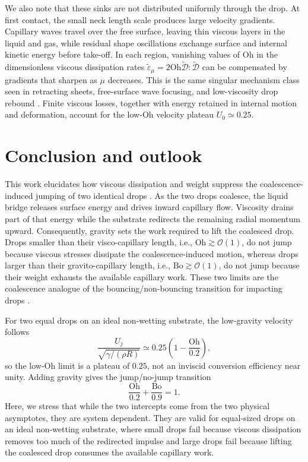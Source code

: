 \documentclass[
reprint,
amsmath,amssymb,
superscriptaddress,
onecolumn,
aps,
prfluids,
longbibliography,
floatfix
]{revtex4-2}
\newcommand{\Oh}{\mathrm{Oh}}
\newcommand{\Bo}{\mathrm{Bo}}
\begin{document}
We also note that these sinks are not distributed uniformly through the drop. At first contact, the small neck length scale produces large velocity gradients. Capillary waves travel over the free surface, leaving thin viscous layers in the liquid and gas, while residual shape oscillations exchange surface and internal kinetic energy before take-off. In each region, vanishing values of $\Oh$ in the dimensionless viscous dissipation rates $\tilde{\varepsilon}_\mu = 2\Oh\bm{\tilde{\mathcal{D}}}:\bm{\tilde{\mathcal{D}}}$ can be compensated by gradients that sharpen as $\mu$ decreases. This is the same singular mechanism class seen in retracting sheets, free-surface wave focusing, and low-viscosity drop rebound \cite{sanjay2022taylor,kayal2025focusing,sanjay2025unifying}. Finite viscous losses, together with energy retained in internal motion and deformation, account for the low-$\Oh$ velocity plateau $U_0\simeq0.25$.

\section{Conclusion and outlook}\label{sec:discussion}

This work elucidates how viscous dissipation and weight suppress the coalescence-induced jumping of two identical drops \cite{boreyko2009self}. As the two drops coalesce, the liquid bridge releases surface energy and drives inward capillary flow. Viscosity drains part of that energy while the substrate redirects the remaining radial momentum upward. Consequently, gravity sets the work required to lift the coalesced drop.
Drops smaller than their visco-capillary length, i.e., $\Oh \gtrsim \mathcal{O}(1)$, do not jump because viscous stresses dissipate the coalescence-induced motion, whereas drops larger than their gravito-capillary length, i.e., $\Bo \gtrsim \mathcal{O}(1)$, do not jump because their weight exhausts the available capillary work.
These two limits are the coalescence analogue of the bouncing/non-bouncing transition for impacting drops \cite{sanjay2023bouncing}.

For two equal drops on an ideal non-wetting substrate, the low-gravity velocity follows
\begin{equation}
    \frac{U_j}{\sqrt{\gamma/(\rho R)}}\simeq0.25\left(1-\frac{\Oh}{0.2}\right),
\end{equation}
so the low-$\Oh$ limit is a plateau of $0.25$, not an inviscid conversion efficiency near unity. Adding gravity gives the jump/no-jump transition
\begin{equation}
    \frac{\Oh}{0.2}+\frac{\Bo}{0.9}=1.
\end{equation}
Here, we stress that while the two intercepts come from the two physical asymptotes, they are system dependent. They are valid for equal-sized drops on an ideal non-wetting substrate, where small drops fail because viscous dissipation removes too much of the redirected impulse and large drops fail because lifting the coalesced drop consumes the available capillary work.
\end{document}
